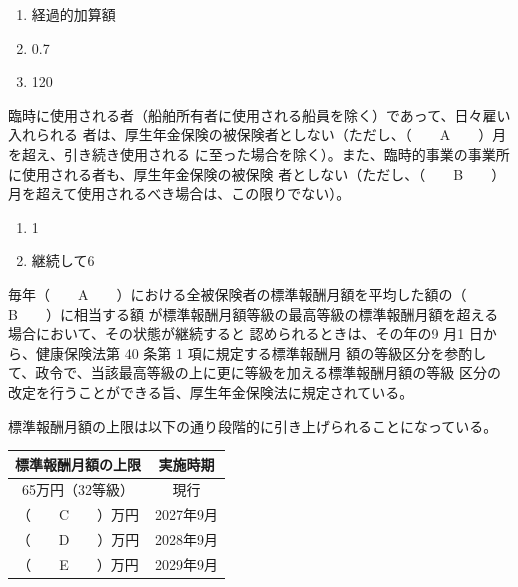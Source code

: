 \begin{answerbox}
  \begin{enumerate}[A: ]
    \item 経過的加算額
    \item 0.7
    \item 120
  \end{enumerate}
\end{answerbox}


\begin{fillblank}[年金1 2020 問題1(5)\textcircled{1}]
  臨時に使用される者（船舶所有者に使用される船員を除く）であって、日々雇い入れられる
者は、厚生年金保険の被保険者としない（ただし、（　　A　　）月を超え、引き続き使用される
に至った場合を除く）。また、臨時的事業の事業所に使用される者も、厚生年金保険の被保険
者としない（ただし、（　　B　　）月を超えて使用されるべき場合は、この限りでない）。
\end{fillblank}

\begin{answerbox}
  \begin{enumerate}[A: ]
    \item 1
    \item 継続して6
  \end{enumerate}
\end{answerbox}

\begin{fillblank}[年金1 2020 問題1(5)\textcircled{2} 改題]
  毎年（　　A　　）における全被保険者の標準報酬月額を平均した額の（　　B　　）に相当する額
が標準報酬月額等級の最高等級の標準報酬月額を超える場合において、その状態が継続すると
認められるときは、その年の9 月1 日から、健康保険法第 40 条第 1 項に規定する標準報酬月
額の等級区分を参酌して、政令で、当該最高等級の上に更に等級を加える標準報酬月額の等級
区分の改定を行うことができる旨、厚生年金保険法に規定されている。

標準報酬月額の上限は以下の通り段階的に引き上げられることになっている。
\begin{table}[htbp]
    \centering
    \begin{tabular}{|c|c|} \hline 
      標準報酬月額の上限 &  実施時期 \\ \hline
      65万円（32等級） & 現行 \\ \hline
      （　　C　　）万円 & 2027年9月 \\ \hline
      （　　D　　）万円 & 2028年9月 \\ \hline
      （　　E　　）万円 & 2029年9月 \\ \hline
    \end{tabular}
  \end{table}
\end{fillblank}

